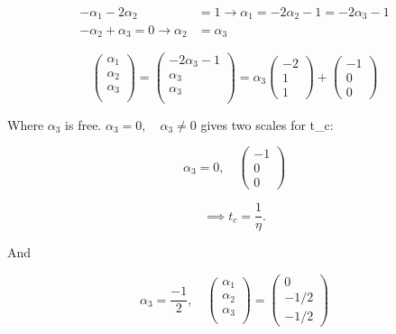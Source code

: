 \documentclass[12pt]{article}
\begin{document}
\begin{equation}
  \begin{aligned}
    -\alpha_1-2\alpha_2 &= 1 \rightarrow \alpha_1=-2\alpha_2-1=-2\alpha_3-1\\
    -\alpha_2 + \alpha_3 = 0 \rightarrow \alpha_2&=\alpha_3
  \end{aligned}
\end{equation}

\begin{equation}
  \begin{pmatrix}
    \alpha_1 \\ \alpha_2 \\\alpha_3 \\
  \end{pmatrix}
  =
  \begin{pmatrix}
    -2\alpha_3-1 \\ \alpha_3 \\\alpha_3 \\
  \end{pmatrix}
  = \alpha_3
  \begin{pmatrix}
    -2 \\ 1 \\ 1
  \end{pmatrix}
  +
  \begin{pmatrix}
    -1 \\ 0 \\ 0
  \end{pmatrix}
\end{equation}

Where $\alpha_3$ is free. $\alpha_3=0, \quad \alpha_3\ne0$ gives two scales for
t\_c:

\begin{equation}
  \alpha_3=0, \quad
  \begin{pmatrix}
    -1 \\ 0 \\ 0
  \end{pmatrix}
\end{equation}

\begin{equation}
  \implies t_c = \frac{1}{\eta}.
\end{equation}

And

\begin{equation}
  \alpha_3 = \frac{-1}{2}, \quad
  \begin{pmatrix}
    \alpha_1 \\ \alpha_2 \\ \alpha_3 \\
  \end{pmatrix}
  =
  \begin{pmatrix}
    0 \\ -1/2 \\ -1/2
  \end{pmatrix}
\end{equation}
\end{document}
